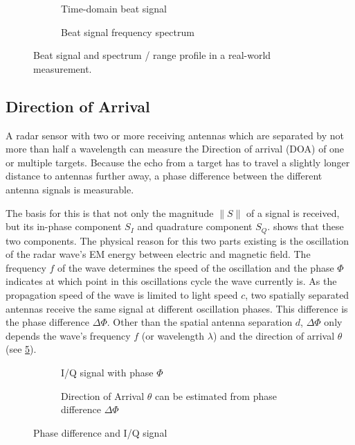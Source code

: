 \begin{figure}[htbp]
    \begin{subfigure}[t]{0.475\textwidth}
        \centering
        \def\svgwidth{\linewidth} \small
        
        \caption{\label{fig:rawbeat_t}Time-domain beat signal}
    \end{subfigure}%
    \hfill%
    \begin{subfigure}[t]{0.475\textwidth}
        \centering
        \def\svgwidth{\linewidth} \small
        
        \caption{\label{fig:rawbeat_f}Beat signal frequency spectrum}
    \end{subfigure}
    \caption{\label{fig:fig_raw_beat}Beat signal and spectrum / range profile in a real-world measurement.}
\end{figure}

\subsection{Direction of Arrival}\label{direction-of-arrival}

A radar sensor with two or more receiving antennas which are separated
by not more than half a wavelength can measure the Direction of arrival
(DOA) of one or multiple targets. Because the echo from a target has to
travel a slightly longer distance to antennas further away, a phase
difference between the different antenna signals is measurable.

The basis for this is that not only the magnitude $\|S\|$ of a signal is received, but its in-phase component $S_I$ and quadrature component $S_Q$.  shows that these two components. The physical reason for this two parts existing is the oscillation of the radar wave's EM energy between electric and magnetic field. The frequency $f$ of the wave determines the speed of the oscillation and the phase $\Phi$ indicates at which point in this oscillations cycle the wave currently is. As the propagation speed of the wave is limited to light speed $c$, two spatially separated antennas receive the same signal at different oscillation phases. This difference is the phase difference $\Delta\Phi$. Other than the spatial antenna separation $d$, $\Delta\Phi$ only depends the wave's frequency $f$ (or wavelength $\lambda$) and the direction of arrival $\theta$ (see \cref{fig:doa}).

\begin{figure}[htbp]
    \begin{subfigure}[t]{0.5\textwidth}
        \centering
        \def\svgscale{1}
        
        \caption{I/Q signal with phase $\Phi$}
        \label{fig:iq}
    \end{subfigure}
    \begin{subfigure}[t]{0.5\textwidth}
        \centering
        \def\svgscale{1}
        
        \caption{Direction of Arrival \(\theta\) can be estimated from phase difference \(\Delta\Phi\)}
        \label{fig:doa}
    \end{subfigure}
    \caption{Phase difference and I/Q signal}
    \label{fig:doiq}
\end{figure}

